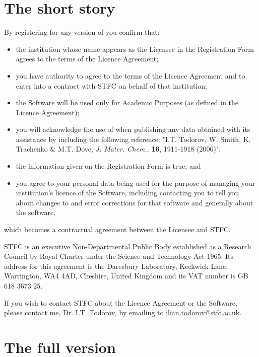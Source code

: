 \section{The short story}
\label{licence}

By registering for any version of \D you confirm that:
\begin{itemize}
\item the institution whose name appears as the Licensee in the Registration Form
agrees to the terms of the Licence Agreement;

\item you have authority to agree to the terms of the Licence Agreement and to
enter into a contract with STFC on behalf of that institution;

\item the \D Software will be used only for Academic Purposes (as defined
in the Licence Agreement);

\item you will acknowledge the use of \D when publishing any data obtained
with its assistance by including the following reference: "I.T. Todorov, W. Smith,
K. Trachenko \& M.T. Dove, {\em J. Mater. Chem.}, {\bf 16}, 1911-1918 (2006)";

\item the information given on the Registration Form is true; and

\item you agree to your personal data being used for the purpose of managing your
institution's licence of the \D Software, including contacting you to tell
you about changes to and error corrections for that software and generally about
the software,
\end{itemize}
which becomes a contractual agreement between the Licensee and STFC.

STFC is an executive Non-Departmental Public Body established as a Research Council
by Royal Charter under the Science and Technology Act 1965.  Its address for this
agreement is the Daresbury Laboratory, Keckwick Lane, Warrington, WA4 4AD, Cheshire,
United Kingdom and its VAT number is GB 618 3673 25.

If you wish to contact STFC about the Licence Agreement or the \D Software, please
contact me, Dr. I.T. Todorov, by emailing to {\href{mailto:ilian.todorov@stfc.ac.uk}{ilian.todorov@stfc.ac.uk}}.

\section{The full version}

